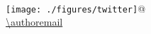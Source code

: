 {\begin{frame}
 
\begin{columns}[t]
\column{0.8\hsize}
\begin{columns}[t]
\column{0.6\hsize}
\insertauthor \\[2mm]
\authoraffiliation\\[2mm]
\column{0.25\hsize}
\\[2mm]
\texttt{[image: ./figures/twitter]}{\small @\authortwitter}\\[-1mm]
\mbox{\small \url{\authoremail}}
\end{columns}
\column{0.14\hsize}
\end{columns}
\vspace{7mm}
\insertdate
\end{frame}
}


